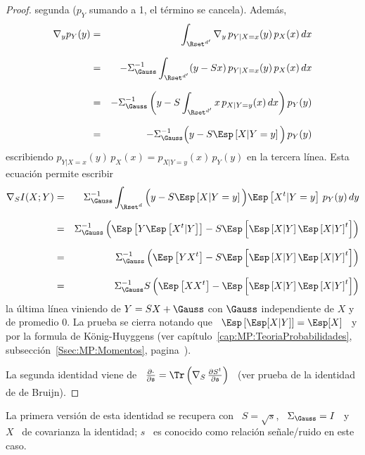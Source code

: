 \begin{proof}
  segunda ($p_Y$ sumando a 1, el t\'ermino se cancela). Adem\'as,
  \begin{eqnarray*}
  \nabla_y p_Y(y) & = & \int_{\Rset^{d'}} \nabla_y \, p_{Y|X=x}(y) \, p_X(x) \,
  dx\\[2.5mm]
  & = & - \Sigma_\Gauss^{-1} \int_{\Rset^{d'}} (y - S x) \, p_{Y|X=x}(y) \, p_X(x) \,
  dx\\[2.5mm]
  & = & - \Sigma_\Gauss^{-1} \left( y - S \int_{\Rset^{d'}} x \, p_{X|Y=y}(x) \,dx
  \right) p_Y(y)\\[2.5mm]
  & = & - \Sigma_\Gauss^{-1} \Big( y - S \Esp\left[X | Y=y \right] \Big) \, p_Y(y)
  \end{eqnarray*}
  escribiendo $p_{Y|X=x}(y)  \, p_X(x) =  p_{X|Y=y}(x) \, p_Y(y)$ en  la tercera
  l\'inea. Esta ecuaci\'on permite escribir
  \begin{eqnarray*}
  \nabla_S I(X;Y) & = & \Sigma_\Gauss^{-1} \int_{\Rset^d} \Big( y - S \Esp\left[X |
  Y=y \right] \Big) \Esp\left[X^t | Y=y \right] \, p_Y(y) \, dy\\[2.5mm]
  & = & \Sigma_\Gauss^{-1} \left( \Esp\left[ Y \Esp\left[ X^t|Y \right] \right] - S
  \Esp\left[ \Esp\left[X | Y \right] \Esp\left[X | Y \right]^t \right]
  \right)\\[2.5mm]
  & = & \Sigma_\Gauss^{-1} \left( \Esp\left[ Y X^t \right] - S \Esp\left[
  \Esp\left[X | Y \right] \Esp\left[X | Y \right]^t \right] \right)\\[2.5mm]
  & = & \Sigma_\Gauss^{-1} S \left( \Esp\left[ X X^t \right] - \Esp\left[
  \Esp\left[X | Y \right] \Esp\left[X | Y \right]^t \right] \right)
  \end{eqnarray*}
  la \'ultima l\'inea viniendo de $Y  = S X + \Gauss$ con $\Gauss$ independiente
  de  $X$ y  de  promedio 0.   La prueba  se  cierra notando  que \  $\Esp\left[
    \Esp[X|Y] \right]  = \Esp[X]$  \ y por  la formula de  K\"onig-Huyggens (ver
  cap\'itulo~\ref{cap:MP:TeoriaProbabilidades},
  subsecci\'on~\ref{Ssec:MP:Momentos}, pagina~\pageref{Ssec:MP:Momentos}).

  La  segunda identidad  viene de  \ $\frac{\partial  \cdot}{\partial  \mathfrak{s}} =
  \Tr\left(  \nabla_S \,  \frac{\partial S^t}{\partial  \mathfrak{s}} \right)$  \ (ver
  prueba de la identidad de de Bruijn).
\end{proof}
%
\noindent  La  primera versi\'on  de  esta  identidad se  recupera  con  \ $S  =
\sqrt{s}$, \ $\Sigma_\Gauss =  I$ \ y \ $X$ \ de  covarianza la identidad; $s$ \
es conocido como relaci\'on se\~nale/ruido en este caso.

